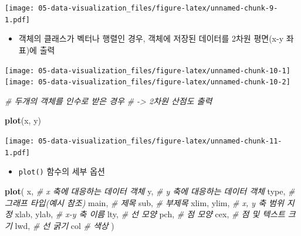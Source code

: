 \documentclass[
  11pt,
]{krantz}
\newenvironment{Shaded}{\begin{snugshade}}{\end{snugshade}}
\newcommand{\CommentTok}[1]{\textcolor[rgb]{0.37,0.37,0.37}{\textit{#1}}}
\newcommand{\KeywordTok}[1]{\textcolor[rgb]{0.27,0.27,0.27}{\textbf{#1}}}
\newcommand{\NormalTok}[1]{#1}
\newcommand{\OperatorTok}[1]{\textcolor[rgb]{0.43,0.43,0.43}{\textbf{#1}}}
\newcommand{\StringTok}[1]{\textcolor[rgb]{0.5,0.5,0.5}{#1}}
\providecommand{\tightlist}{%
  \setlength{\itemsep}{0pt}\setlength{\parskip}{0pt}}
\begin{document}
\texttt{[image: 05-data-visualization\_files/figure-latex/unnamed-chunk-9-1.pdf]}

\normalsize

\begin{itemize}
\tightlist
\item
  객체의 클래스가 벡터나 행렬인 경우, 객체에 저장된 데이터를 2차원 평면(x-y 좌표)에 출력
\end{itemize}

\footnotesize

\begin{Shaded}
\end{Shaded}

\texttt{[image: 05-data-visualization\_files/figure-latex/unnamed-chunk-10-1]}
\texttt{[image: 05-data-visualization\_files/figure-latex/unnamed-chunk-10-2]}

\normalsize

\footnotesize

\begin{Shaded}
\begin{Highlighting}[]
\CommentTok{# 두개의 객체를 인수로 받은 경우}
\CommentTok{# -> 2차원 산점도 출력}

\KeywordTok{plot}\NormalTok{(x, y)}
\end{Highlighting}
\end{Shaded}

\texttt{[image: 05-data-visualization\_files/figure-latex/unnamed-chunk-11-1.pdf]}

\normalsize

\begin{itemize}
\tightlist
\item
  \texttt{plot()} 함수의 세부 옵션
\end{itemize}

\footnotesize

\begin{Shaded}
\begin{Highlighting}[]
\KeywordTok{plot}\NormalTok{(}
\NormalTok{  x, }\CommentTok{# x 축에 대응하는 데이터 객체}
\NormalTok{  y, }\CommentTok{# y 축에 대응하는 데이터 객체}
\NormalTok{  type, }\CommentTok{# 그래프 타입(예시 참조)}
\NormalTok{  main, }\CommentTok{# 제목 }
\NormalTok{  sub,  }\CommentTok{# 부제목 }
\NormalTok{  xlim, ylim, }\CommentTok{# x, y 축 범위 지정}
\NormalTok{  xlab, ylab, }\CommentTok{# x-y 축 이름}
\NormalTok{  lty, }\CommentTok{# 선 모양}
\NormalTok{  pch, }\CommentTok{# 점 모양}
\NormalTok{  cex, }\CommentTok{# 점 및 텍스트 크기}
\NormalTok{  lwd, }\CommentTok{# 선 굵기}
\NormalTok{  col  }\CommentTok{# 색상}
\NormalTok{)}
\end{Highlighting}
\end{Shaded}
\end{document}
